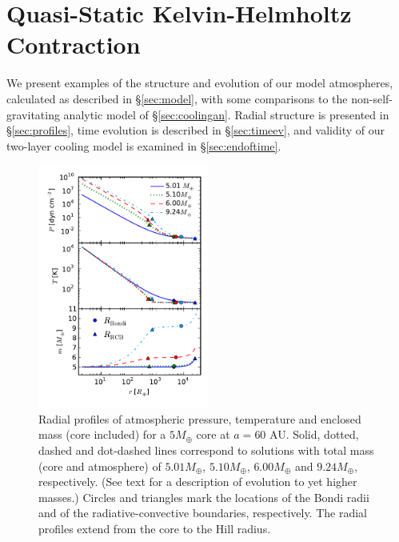 \documentclass[apj, numberedappendix]{emulateapj}
\newcommand{\MC}{M_{\rm crit}}
\begin{document}



\section{Quasi-Static Kelvin-Helmholtz Contraction}
\label{sec:KH}

We present examples of the structure and evolution of our model atmospheres, calculated as described in \S\ref{sec:model}, with some comparisons to the non-self-gravitating analytic model of \S\ref{sec:coolingan}.  Radial structure is presented in \S\ref{sec:profiles}, time evolution is described in \S\ref{sec:timeev}, and validity of our two-layer cooling model is examined in \S\ref{sec:endoftime}.

\begin{figure}[tb]
\centering
\includegraphics[width=0.5\textwidth]{../../figs/ModelAtmospheres/RadSelfGravPoly/PaperFigs/PTm_profiles_v2_smallM.pdf}
\caption{Radial profiles of atmospheric pressure, temperature and enclosed mass (core included) for a $5 M_{\oplus}$ core at $a=60$ AU.   Solid, dotted, dashed and dot-dashed lines correspond to solutions with total mass (core and atmosphere) of $5.01 M_{\oplus}$, $5.10 M_{\oplus}$, $6.00 M_{\oplus}$ and $9.24 M_{\oplus}$, respectively.  (See text for a description of evolution to yet higher masses.)   Circles and triangles mark the locations of the Bondi radii and of the radiative-convective boundaries, respectively.  The radial profiles extend from the core to the Hill radius.} 
\label{fig:profiles}
\end{figure}
\end{document}

